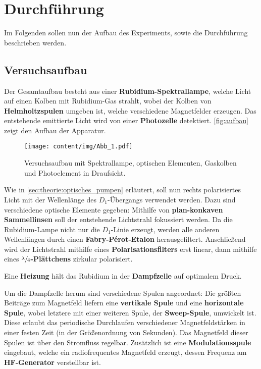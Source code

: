 \section{Durchführung}
\label{sec:durchfuehrung}

    Im Folgenden sollen nun der Aufbau des Experiments,
    sowie die Durchführung beschrieben werden.

\subsection{Versuchsaufbau}

    Der Gesamtaufbau besteht aus einer \textbf{Rubidium-Spektrallampe},
    welche Licht auf einen Kolben mit Rubidium-Gas strahlt,
    wobei der Kolben von \textbf{Helmholtzspulen} umgeben ist,
    welche verschiedene Magnetfelder erzeugen.
    Das entstehende emittierte Licht wird von einer \textbf{Photozelle} detektiert.
    \autoref{fig:aufbau} zeigt den Aufbau der Apparatur.
    \begin{figure}
        \centering
        \texttt{[image: content/img/Abb\_1.pdf]}
        \caption{Versuchsaufbau mit Spektrallampe, optischen Elementen, Gaskolben und Photoelement in Draufsicht. \cite{versuchsanleitung}}
        \label{fig:aufbau}
    \end{figure}

    Wie in \autoref{sec:theorie:optisches_pumpen} erläutert,
    soll nun rechts polarisiertes Licht mit der Wellenlänge des $D_1$-Übergangs verwendet werden.
    Dazu sind verschiedene optische Elemente gegeben:
    Mithilfe von \textbf{plan-konkaven Sammellinsen} soll der entstehende Lichtstrahl fokussiert werden.
    Da die Rubidium-Lampe nicht nur die $D_1$-Linie erzeugt,
    werden alle anderen Wellenlängen durch einen \textbf{Fabry-Pérot-Etalon} herausgefiltert.
    Anschließend wird der Lichtstrahl mithilfe eines \textbf{Polarisationsfilters} erst linear,
    dann mithilfe eines \textbf{$\sfrac{\lambda}{4}$-Plättchens} zirkular polarisiert.

    Eine \textbf{Heizung} hält das Rubidium in der \textbf{Dampfzelle} auf optimalem Druck.

    Um die Dampfzelle herum sind verschiedene Spulen angeordnet:
    Die größten Beiträge zum Magnetfeld liefern eine \textbf{vertikale Spule} und eine \textbf{horizontale Spule},
    wobei letztere mit einer weiteren Spule, der \textbf{Sweep-Spule}, umwickelt ist.
    Diese erlaubt das periodische Durchlaufen verschiedener Magnetfeldstärken in einer festen Zeit
    (in der Größenordnung von Sekunden).
    Das Magnetfeld dieser Spulen ist über den Stromfluss regelbar.
    Zusätzlich ist eine \textbf{Modulationsspule} eingebaut,
    welche ein radiofrequentes Magnetfeld erzeugt,
    dessen Frequenz am \textbf{HF-Generator} verstellbar ist.

